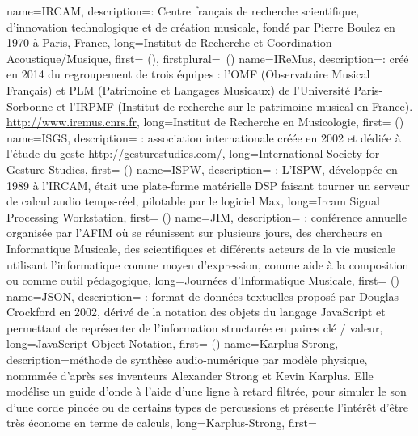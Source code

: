 {
    name={IRCAM},
    description={\textit{}: Centre français de recherche scientifique, d'innovation technologique et de création musicale, fondé par Pierre Boulez en 1970 à Paris, France},
    long={Institut de Recherche et Coordination Acoustique/Musique},
    first={ ()},
    firstplural={\glspluralsuffix\ (\glspluralsuffix)}
}
{
    name={IReMus},
    description={\textit{}: créé en 2014 du regroupement de trois équipes : l'OMF (Observatoire Musical Français) et PLM (Patrimoine et Langages Musicaux) de l’Université Paris-Sorbonne et l’IRPMF (Institut de recherche sur le patrimoine musical en France). \url{http://www.iremus.cnrs.fr}},
    long={Institut de Recherche en Musicologie},
    first={ ()}
}
{
    name={ISGS},
    description={\textit{} : association internationale créée en 2002 et dédiée à l'étude du geste \url{http://gesturestudies.com/}},
    long={International Society for Gesture Studies},
    first={ ()}
}
{
    name={ISPW},
    description={\textit{} : L'ISPW, développée en 1989 à l'\gls{IRCAM}, était une plate-forme matérielle \gls{DSP} faisant tourner un serveur de calcul audio temps-réel, pilotable par le logiciel Max},
    long={Ircam Signal Processing Workstation},
    first={ ()}
}
{
    name={JIM},
    description={\textit{} : conférence annuelle organisée par l'\gls{AFIM} où se réunissent sur plusieurs jours, des chercheurs en Informatique Musicale, des scientifiques et différents acteurs de la vie musicale utilisant l'informatique comme moyen d'expression, comme aide à la composition ou comme outil pédagogique},
    long={Journées d'Informatique Musicale},
    first={ ()}
}
{
    name={JSON},
    description={\textit{} : format de données textuelles proposé par Douglas Crockford en 2002, dérivé de la notation des objets du langage JavaScript et permettant de représenter de l’information structurée en paires clé / valeur},
    long={JavaScript Object Notation},
    first={ ()}
}
{
    name={Karplus-Strong},
    description={méthode de synthèse audio-numérique par modèle physique, nommmée d'après ses inventeurs Alexander Strong et Kevin Karplus. Elle modélise un guide d'onde à l'aide d'une ligne à retard filtrée, pour simuler le son d'une corde pincée ou de certains types de percussions et présente l'intérêt d'être très économe en terme de calculs},
    long={Karplus-Strong},
    first={}
}
